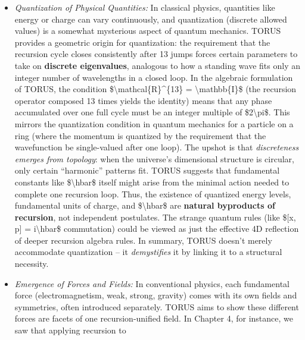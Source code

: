 \documentclass[
]{article}
\begin{document}
{\begin{itemize}
\item
  \emph{Quantization of Physical Quantities:} In classical physics,
  quantities like energy or charge can vary continuously, and
  quantization (discrete allowed values) is a somewhat mysterious aspect
  of quantum mechanics. TORUS provides a geometric origin for
  quantization: the requirement that the recursion cycle closes
  consistently after 13 jumps forces certain parameters to take on
  \textbf{discrete eigenvalues}, analogous to how a standing wave fits
  only an integer number of wavelengths in a closed loop\hspace{0pt}. In
  the algebraic formulation of TORUS, the condition
  \$\textbackslash mathcal\{R\}\^{}\{13\} = \textbackslash mathbb\{I\}\$
  (the recursion operator composed 13 times yields the identity) means
  that any phase accumulated over one full cycle must be an integer
  multiple of \$2\textbackslash pi\$\hspace{0pt}. This mirrors the
  quantization condition in quantum mechanics for a particle on a ring
  (where the momentum is quantized by the requirement that the
  wavefunction be single-valued after one loop)\hspace{0pt}. The upshot
  is that \emph{discreteness emerges from topology}: when the universe's
  dimensional structure is circular, only certain ``harmonic'' patterns
  fit. TORUS suggests that fundamental constants like
  \$\textbackslash hbar\$ itself might arise from the minimal action
  needed to complete one recursion loop\hspace{0pt}. Thus, the existence
  of quantized energy levels, fundamental units of charge, and
  \$\textbackslash hbar\$ are \textbf{natural byproducts of recursion},
  not independent postulates\hspace{0pt}. The strange quantum rules
  (like \${[}x, p{]} = i\textbackslash hbar\$ commutation) could be
  viewed as just the effective 4D reflection of deeper recursion algebra
  rules\hspace{0pt}. In summary, TORUS doesn't merely accommodate
  quantization -- it \emph{demystifies} it by linking it to a structural
  necessity.
\item
  \emph{Emergence of Forces and Fields:} In conventional physics, each
  fundamental force (electromagnetism, weak, strong, gravity) comes with
  its own fields and symmetries, often introduced separately. TORUS aims
  to show these different forces are facets of one recursion-unified
  field. In Chapter 4, for instance, we saw that applying recursion to

\end{itemize}}
\end{document}
